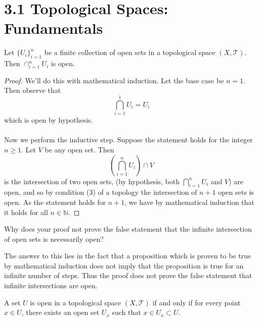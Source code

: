 \documentclass[letterpaper,12pt,twoside]{maths}
\begin{document}
\section*{3.1 Topological Spaces: Fundamentals}  

\begin{problem}[Theorem 3.1.] Let $\{U_i\}_{i=1}^n$ be a finite
 collection of open  sets in a topological space $(X, \mathscr{T})$.
 Then $\cap_{i=1}^n U_i$ is open.
\end{problem}                 

\begin{proof}
    We'll do this with mathematical induction. Let the
    base case be $n = 1$. Then observe that
    \[
      \bigcap\limits_{i=1}^1U_i = U_i  
    \]
    which is open by hypothesis. 
    \\
    \\
    Now we perform the inductive step. Suppose the statement holds for
    the integer $n \ge 1$. Let $V$ be any open set. Then 
    \[
      \left(\bigcap\limits_{i = 1}^n U_i \right) \cap V  
    \] 
    is the intersection of two open sets, (by hypothesis, both 
    $\bigcap\limits_{i = 1}^n U_i$ and $V$) are open, and so by     
    condition (3) of a topology the intersection of $n+1$ open sets is
    open. As the statement holds for $n+1$, we have by mathematical
    induction that it holds for all $n \in \mathbb{N}$.  
\end{proof}

\noindent
\begin{exercise}[Exercise 3.2]
    Why does your proof not prove the false
    statement that the infinite intersection of open sets is necessarily
    open? 
\end{exercise}
 
\begin{solution}
    The answer to this lies in the fact that a proposition which is proven
to be true by mathematical induction does not imply 
that the proposition is
true for an infinite number of steps. Thus the proof does not prove
the false statement that infinite intersections are open.
\end{solution}


\begin{problem}[Theorem 3.3] A set $U$ is open in a topological space
    $(X, \mathscr{T})$ if and only if for every point $x \in U$, there
    exists an open set $U_x$ such that $x \in U_x \subset U$.
\end{problem}
\end{document}
